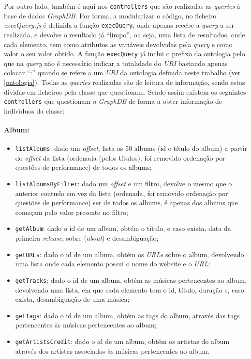 \documentclass{article}
\begin{document}
Por outro lado, também é aqui nos \texttt{controllers} que são realizadas as \textit{queries} à base de dados \textit{GraphDB}. Por forma, a modularizar o código, no ficheiro \textit{execQuery.js} é definida a função \texttt{execQuery}, onde apenas recebe a \textit{query} a ser realizada, e devolve o resultado já ``limpo'', ou seja, uma lista de resultados, onde cada elemento, tem como atributos as variáveis devolvidas pela \textit{query} e como valor o seu valor obtido. A função \texttt{execQuery} já inclui o prefixo da ontologia pelo que na \textit{query} não é necessário indicar a totalidade do \textit{URI} bastando apenas colocar ``:'' quando se refere a um \textit{URI} da ontologia definida neste trabalho (ver \ref{ontologia}). Todas as \textit{queries} realizadas são de leitura de informação, sendo estas dividas em ficheiros pela classe que questionam. Sendo assim existem os seguintes \texttt{controllers} que questionam o \textit{GraphDB} de forma a obter informação de indivíduos da classe:

\paragraph{\textbf{Album:}}
    \begin{itemize}
        \item \texttt{listAlbums}: dado um \textit{offset}, lista os 50 albums (id e título do album) a partir do \textit{offset} da lista (ordenada (pelos títulos), foi removido ordenação por questões de performance) de todos os albums;
        \item \texttt{listAlbumsByFilter}: dado um \textit{offset} e um filtro, devolve o mesmo que o anterior contudo em vez da lista (ordenada, foi removido ordenação por questões de performance) ser de todos os albums, é apenas dos albums que começam pelo valor presente no filtro;
        \item \texttt{getAlbum}: dado o id de um album, obtém o título, e caso exista, data da primeira \textit{release}, sobre (\textit{about}) e desambiguação;
        \item \texttt{getURLs}: dado o id de um album, obtém os \textit{URLs} sobre o album, devolvendo uma lista onde cada elemento possui o nome do website e o \textit{URL};
        \item \texttt{getTracks}: dado o id de um album, obtém as músicas pertencentes ao album, devolvendo uma lista, em que cada elemento tem o id, título, duração e, caso exista, desambiguação de uma música;
        \item \texttt{getTags}: dado o id de um album, obtém as tags do album, através das tags pertencentes às músicas pertencentes ao album;
        \item \texttt{getArtistsCredit}: dado o id de um album, obtém os artistas do album através dos artistas associados às músicas pertencentes ao album.
    \end{itemize}
\end{document}
